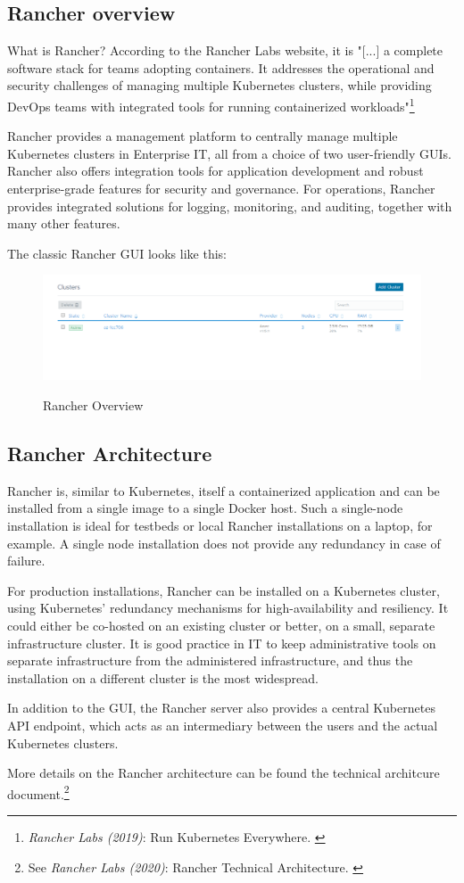 \subsection{Rancher overview}

What is Rancher? According to the Rancher Labs website, it is "[...] a complete software stack for teams adopting containers. It addresses the operational and security challenges of managing multiple Kubernetes clusters, while providing DevOps teams with integrated tools for running containerized workloads"\footnote{\textit{Rancher Labs (2019)}: Run Kubernetes Everywhere. \cite{rancher}}

Rancher provides a management platform to centrally manage multiple Kubernetes clusters in Enterprise IT, all from a choice of two user-friendly GUIs. Rancher also offers integration tools for application development and robust enterprise-grade features for security and governance. For operations, Rancher provides integrated solutions for logging, monitoring, and auditing, together with many other features.

The classic Rancher GUI looks like this:

\begin{figure}[H]
\centering
\caption {Rancher Overview}
\includegraphics[width=\linewidth]{images/cluster-overview.png}
\label{fig:rancherOverview}
\end{figure}

\subsection{Rancher Architecture}

Rancher is, similar to Kubernetes, itself a containerized application and can be installed from a single image to a single Docker host. Such a single-node installation is ideal for testbeds or local Rancher installations on a laptop, for example. A single node installation does not provide any redundancy in case of failure.

For production installations, Rancher can be installed on a Kubernetes cluster, using Kubernetes' redundancy mechanisms for high-availability and resiliency. It could either be co-hosted on an existing cluster or better, on a small, separate infrastructure cluster. It is good practice in IT to keep administrative tools on separate infrastructure from the administered infrastructure, and thus the installation on a different cluster is the most widespread.

In addition to the GUI, the Rancher server also provides a central Kubernetes API endpoint, which acts as an intermediary between the users and the actual Kubernetes clusters.

More details on the Rancher architecture can be found the technical architcure document.\footnote{See \textit{Rancher Labs (2020)}: Rancher Technical Architecture. \cite{technicalArchitecture}}
